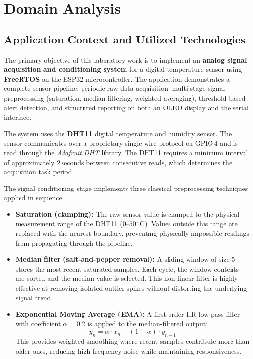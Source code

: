 \section{Domain Analysis}
\subsection{Application Context and Utilized Technologies}

The primary objective of this laboratory work is to implement an \textbf{analog signal
acquisition and conditioning system} for a digital temperature sensor using
\textbf{FreeRTOS} on the ESP32 microcontroller. The application demonstrates a
complete sensor pipeline: periodic raw data acquisition, multi-stage signal
preprocessing (saturation, median filtering, weighted averaging), threshold-based
alert detection, and structured reporting on both an OLED display and the serial
interface.

The system uses the \textbf{DHT11} digital temperature and humidity sensor. The sensor
communicates over a proprietary single-wire protocol on GPIO\,4 and is read through the
\textit{Adafruit DHT} library. The DHT11 requires a minimum interval of approximately
2\,seconds between consecutive reads, which determines the acquisition task period.

The signal conditioning stage implements three classical preprocessing techniques
applied in sequence:
\begin{itemize}
  \item \textbf{Saturation (clamping):} The raw sensor value is clamped to the physical
    measurement range of the DHT11 ($0$--$50\,^\circ$C). Values outside this range are
    replaced with the nearest boundary, preventing physically impossible readings from
    propagating through the pipeline.
  \item \textbf{Median filter (salt-and-pepper removal):} A sliding window of size 5
    stores the most recent saturated samples. Each cycle, the window contents are sorted
    and the median value is selected. This non-linear filter is highly effective at
    removing isolated outlier spikes without distorting the underlying signal trend.
  \item \textbf{Exponential Moving Average (EMA):} A first-order IIR low-pass filter
    with coefficient $\alpha = 0.2$ is applied to the median-filtered output:
    \[
      y_n = \alpha \cdot x_n + (1 - \alpha) \cdot y_{n-1}
    \]
    This provides weighted smoothing where recent samples contribute more than older
    ones, reducing high-frequency noise while maintaining responsiveness.
\end{itemize}


